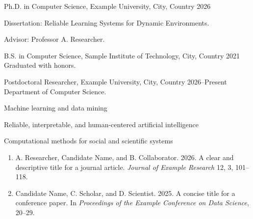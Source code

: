 

\begin{cvrecordlist}
    \cvdateditem
        {Ph.D. in Computer Science, Example University, City, Country}
        {2026}
        {Dissertation: Reliable Learning Systems for Dynamic Environments.\par
         Advisor: Professor A. Researcher.}
    \cvdateditem
        {B.S. in Computer Science, Sample Institute of Technology, City, Country}
        {2021}
        {Graduated with honors.}
\end{cvrecordlist}



\begin{cvrecordlist}
    \cvdateditem
        {Postdoctoral Researcher, Example University, City, Country}
        {2026--Present}
        {Department of Computer Science.}
\end{cvrecordlist}



\begin{cvcompactlist}
    \item Machine learning and data mining
    \item Reliable, interpretable, and human-centered artificial intelligence
    \item Computational methods for social and scientific systems
\end{cvcompactlist}



\begin{cvrecordlist}
\end{cvrecordlist}



\cvpublicationlegend


\begin{enumerate}
    \item A. Researcher, Candidate Name\corresponding, and B. Collaborator. 2026.
    A clear and descriptive title for a journal article.
    \textit{Journal of Example Research} 12, 3, 101--118.

    \item Candidate Name\equalcontrib, C. Scholar\equalcontrib, and D. Scientist.
    2025. A concise title for a conference paper.
    In \textit{Proceedings of the Example Conference on Data Science}, 20--29.
    \par {}
\end{enumerate}

